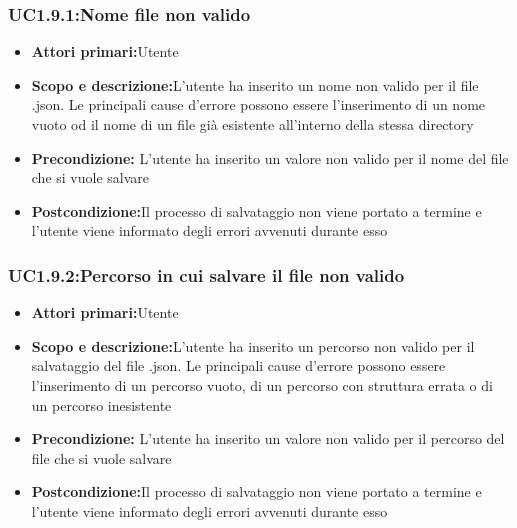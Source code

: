 \subsubsection{UC1.9.1:Nome file non valido}
\begin{itemize}
	\item{\textbf{Attori primari:}Utente}
	\item{\textbf{Scopo e descrizione:}L'utente ha inserito un nome non valido per il file .json. Le principali cause d'errore possono essere l'inserimento di un nome vuoto od il nome di un file già esistente all'interno della stessa directory}
	\item{\textbf{Precondizione:} L'utente ha inserito un valore non valido per il nome del file che si vuole salvare}
	\item{\textbf{Postcondizione:}Il processo di salvataggio non viene portato a termine e l'utente viene informato degli errori avvenuti durante esso}
\end{itemize}
\subsubsection{UC1.9.2:Percorso in cui salvare il file non valido}
\begin{itemize}
	\item{\textbf{Attori primari:}Utente}
	\item{\textbf{Scopo e descrizione:}L'utente ha inserito un percorso non valido per il salvataggio del file .json. Le principali cause d'errore possono essere l'inserimento di un percorso vuoto, di un percorso con struttura errata o di un percorso inesistente}
	\item{\textbf{Precondizione:} L'utente ha inserito un valore non valido per il percorso del file che si vuole salvare}
	\item{\textbf{Postcondizione:}Il processo di salvataggio non viene portato a termine e l'utente viene informato degli errori avvenuti durante esso}
\end{itemize}